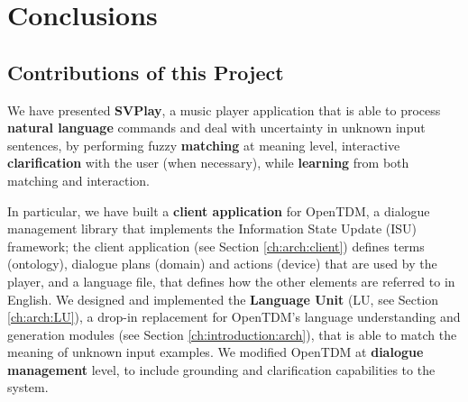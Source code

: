 
\chapter{Conclusions} %

\label{ch:conclusions} %


\section{Contributions of this Project}
We have presented \textbf{SVPlay}, a music player application that is able to process \textbf{natural language} commands and deal with uncertainty in unknown input sentences, by performing fuzzy \textbf{matching} at meaning level, interactive \textbf{clarification} with the user (when necessary), while \textbf{learning} from both matching and interaction.

In particular, we have built a \textbf{client application} for OpenTDM, a dialogue management library that implements the Information State Update (ISU) framework; the client application (see Section \ref{ch:arch:client}) defines terms (ontology), dialogue plans (domain) and actions (device) that are used by the player, and a language file, that defines how the other elements are referred to in English. We designed and implemented the \textbf{Language Unit} (LU, see Section \ref{ch:arch:LU}), a drop-in replacement for OpenTDM's language understanding and generation modules (see Section \ref{ch:introduction:arch}), that is able to match the meaning of unknown input examples. We modified OpenTDM at \textbf{dialogue management} level, to include grounding and clarification capabilities to the system.

